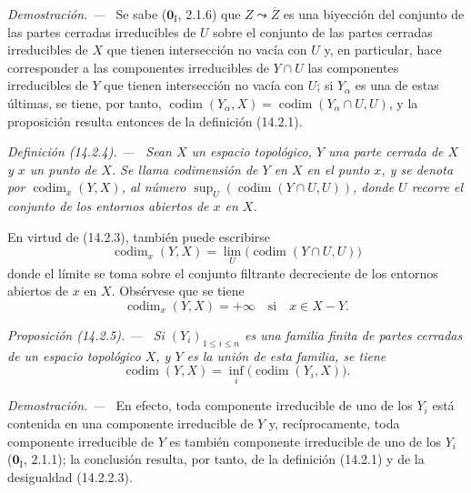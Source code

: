 \documentclass[10pt,oneside]{book}
\makeatletter
\newcommand{\setmanualcurrentlabel}[1]{\def\@currentlabel{#1}}
\newcommand{\oldpage}[2][]{%
  \setcounter{footnote}{0}%
  \marginpar{\scriptsize\textbf{#1}~|~#2}\ignorespaces}
\newenvironment{definition}[1][]{%
  \setmanualcurrentlabel{#1}\par\medskip\noindent\itshape Definición (#1). ---\ }{\par}
\newenvironment{proposition}[1][]{%
  \setmanualcurrentlabel{#1}\par\medskip\noindent\itshape Proposición (#1). ---\ }{\par}
\newenvironment{proof}{%
  \par\medskip\noindent\textit{Demostración. ---\ }}{\par}
\providecommand{\setmin}{-}%
\makeatother
\begin{document}
\begin{proof}
Se sabe ($\mathbf 0_{\mathrm I}$, 2.1.6) que $Z\leadsto\overline Z$ es una biyección
del conjunto de las partes cerradas irreducibles de $U$ sobre el conjunto de
las partes cerradas irreducibles de $X$ que tienen intersección no vacía con
$U$ y, en particular, hace corresponder a las componentes irreducibles de
$Y\cap U$ las componentes irreducibles de $Y$ que tienen intersección no vacía
con $U$; si $Y_\alpha$ es una de estas últimas,
se tiene, por tanto,
$\operatorname{codim}(Y_\alpha,X)=
\operatorname{codim}(Y_\alpha\cap U,U)$, y la proposición resulta entonces de
la definición (14.2.1).
\end{proof}

\begin{definition}[14.2.4]
\label{0.14.2.4-es}
Sean $X$ un espacio topológico, $Y$ una parte cerrada de $X$ y $x$ un punto de
$X$. Se llama codimensión de $Y$ en $X$ en el punto $x$, y se denota
por $\operatorname{codim}_x(Y,X)$, al número
$\sup_U(\operatorname{codim}(Y\cap U,U))$, donde $U$ recorre el conjunto de
los entornos abiertos de $x$ en $X$.
\end{definition}

En virtud de (14.2.3), también puede escribirse
\[
  \operatorname{codim}_x(Y,X)=
  \lim_U\bigl(\operatorname{codim}(Y\cap U,U)\bigr)
  \tag{14.2.4.1}\label{0.14.2.4.1-es}
\]
donde el límite se toma sobre el conjunto filtrante decreciente de los
entornos abiertos de $x$ en $X$. Obsérvese que se tiene
\[
  \operatorname{codim}_x(Y,X)=+\infty\quad\text{si}\quad x\in X\setmin Y.
\]

\oldpage[0\textsubscript{IV-1}]{10}
\begin{proposition}[14.2.5]
\label{0.14.2.5-es}
Si $(Y_i)_{1\leq i\leq n}$ es una familia finita de partes cerradas de un
espacio topológico $X$, y $Y$ es la unión de esta familia, se tiene
\[
  \operatorname{codim}(Y,X)=
  \inf_i\bigl(\operatorname{codim}(Y_i,X)\bigr).
  \tag{14.2.5.1}\label{0.14.2.5.1-es}
\]
\end{proposition}

\begin{proof}
En efecto, toda componente irreducible de uno de los $Y_i$ está contenida en
una componente irreducible de $Y$ y, recíprocamente, toda componente
irreducible de $Y$ es también componente irreducible de uno de los $Y_i$
($\mathbf{0}_{\mathrm I}$, 2.1.1); la conclusión resulta, por tanto, de la definición
(14.2.1) y de la desigualdad (14.2.2.3).
\end{proof}
\end{document}
